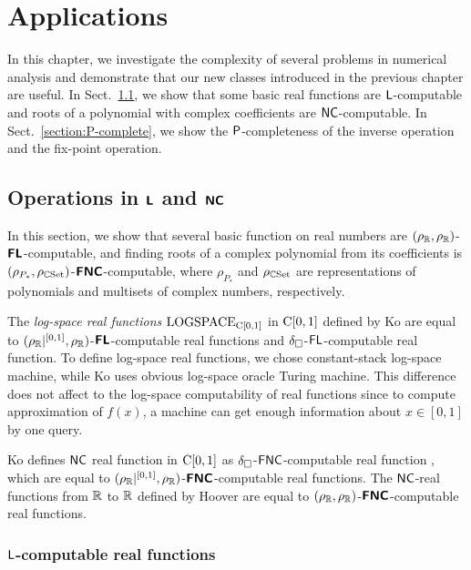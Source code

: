 \documentclass[envcountsame,orivec,oribibl]{llncs}
\begin{document}
\section{Applications}
\label{section:applications}
In this chapter, we investigate the complexity of several problems in numerical
analysis and demonstrate that our new classes introduced in the previous
chapter are useful.
In Sect.~\ref{section:function}, 
we show that some basic real functions are $\mathsf{L}$-computable and
roots of a polynomial with complex coefficients are $\mathsf{NC}$-computable.
In Sect.~\ref{section:P-complete}, we show the $\mathsf{P}$-completeness of 
the inverse operation and the fix-point operation.

\subsection{Operations in $\text{\bfseries \sffamily \upshape L}$ and $\text{\bfseries \sffamily \upshape NC}$}
\label{section:function}

In this section, we show that several basic function on real numbers are
 $(\rho _\mathbb R, \rho _\mathbb R)$-$\text{\bfseries \sffamily \upshape FL}$-computable,
and finding roots of a complex polynomial from its coefficients is 
$(\rho_{P_*}, \rho_{\mathbb C\mathrm{Set}})$-$\text{\bfseries \sffamily \upshape FNC}$-computable,
where $\rho_{P_*}$ and $\rho_{\mathbb C\mathrm{Set}}$ are representations of 
polynomials and multisets of complex numbers, respectively.

The {\em log-space real functions} $\mathrm{LOGSPACE}_{\mathrm C[0,1]}$ in 
$\mathrm C[0,1]$ defined by Ko \cite{ko1991complexity} 
are equal to $(\rho _\mathbb R|^{[0,1]}, \rho _\mathbb R)$-$\text{\bfseries \sffamily \upshape FL}$-computable real functions
and $\delta _\square$-$\mathsf{FL}$-computable real function.
To define log-space real functions, 
we chose constant-stack log-space machine,
while Ko uses obvious log-space oracle Turing machine.
This difference does not affect to the log-space computability of real functions
since to compute approximation of $f(x)$,
a machine can get enough information about $x \in [0,1]$ by one query.

Ko defines $\mathsf{NC}$ real function in $\mathrm C[0,1]$
as $\delta _\square$-$\mathsf{FNC}$-computable real function \cite{ko1991complexity},
which are equal to $(\rho _\mathbb R|^{[0,1]}, \rho _\mathbb R)$-$\text{\bfseries \sffamily \upshape FNC}$-computable real functions.
The $\mathsf{NC}$-real functions from $\mathbb R$ to $\mathbb R$ defined by Hoover \cite{hoover1991real}
are equal to $(\rho _\mathbb R, \rho _\mathbb R)$-$\text{\bfseries \sffamily \upshape FNC}$-computable real functions.



\subsubsection{$\mathsf{L}$-computable real functions}
\end{document}
